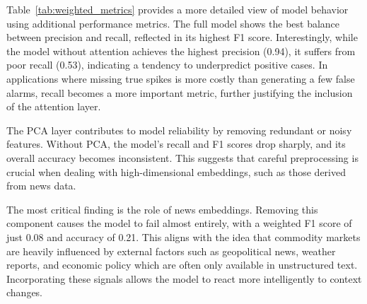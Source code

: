 \documentclass[12pt]{elsarticle}
\begin{document}
\begin{table}[H]
\centering
\caption{Weighted performance metrics. $\Delta$F1 indicates drop relative to the full model.}
\label{tab:weighted_metrics}
\end{table}


Table~\ref{tab:weighted_metrics} provides a more detailed view of model behavior using additional performance metrics. The full model shows the best balance between precision and recall, reflected in its highest F1 score. Interestingly, while the model without attention achieves the highest precision (0.94), it suffers from poor recall (0.53), indicating a tendency to underpredict positive cases. In applications where missing true spikes is more costly than generating a few false alarms, recall becomes a more important metric, further justifying the inclusion of the attention layer.

The PCA layer contributes to model reliability by removing redundant or noisy features. Without PCA, the model’s recall and F1 scores drop sharply, and its overall accuracy becomes inconsistent. This suggests that careful preprocessing is crucial when dealing with high-dimensional embeddings, such as those derived from news data.

The most critical finding is the role of news embeddings. Removing this component causes the model to fail almost entirely, with a weighted F1 score of just 0.08 and accuracy of 0.21. This aligns with the idea that commodity markets are heavily influenced by external factors such as geopolitical news, weather reports, and economic policy which are often only available in unstructured text. Incorporating these signals allows the model to react more intelligently to context changes.
\end{document}

